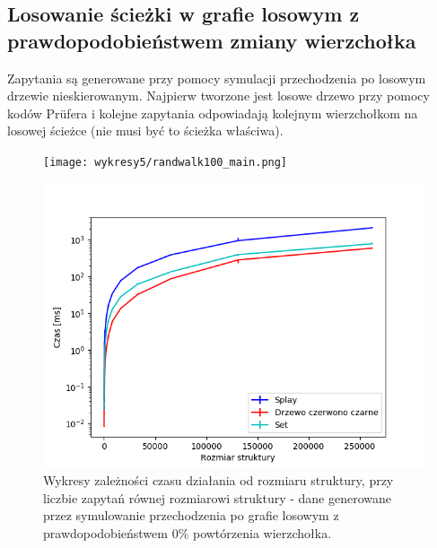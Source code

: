 \documentclass[declaration,shortabstract]{iithesis}
\theoremstyle{thm}
\theoremstyle{remark}
\theoremstyle{plain}
\theoremstyle{plain}
\theoremstyle{plain}
\begin{document}
\subsection{Losowanie ścieżki w grafie losowym z prawdopodobieństwem zmiany wierzchołka}
Zapytania są generowane przy pomocy symulacji przechodzenia po losowym drzewie nieskierowanym. Najpierw tworzone jest losowe drzewo przy pomocy kodów Prüfera \cite{Prufer_codes} i kolejne zapytania odpowiadają kolejnym wierzchołkom na losowej ścieżce (nie musi być to ścieżka właściwa).


\begin{figure}[H]
\begin{minipage}[b]{.45\textwidth}
\centering
\texttt{[image: wykresy5/randwalk100\_main.png]}
\end{minipage}
\hfill
\begin{minipage}[b]{.45\textwidth}
\centering
\includegraphics[width=1\textwidth]{wykresy3/randwalk100_main.png}
\end{minipage}
\caption{Wykresy zależności czasu działania od rozmiaru struktury, przy liczbie zapytań równej rozmiarowi struktury - dane generowane przez symulowanie przechodzenia po grafie losowym z prawdopodobieństwem  \(0\%\) powtórzenia wierzchołka.}
\end{figure}
\end{document}
